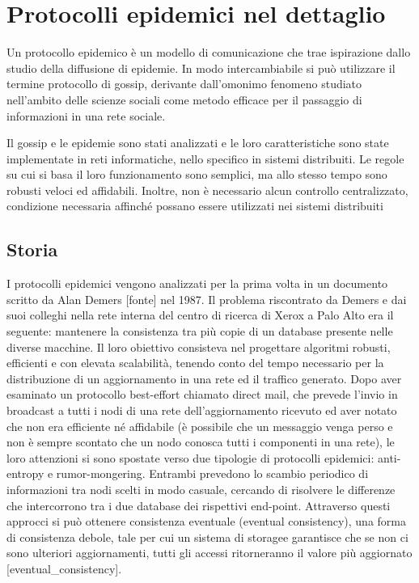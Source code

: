 \chapter{Protocolli epidemici nel dettaglio}
Un protocollo epidemico è un modello di comunicazione che trae ispirazione dallo studio della diffusione di epidemie. In modo intercambiabile si può utilizzare il termine protocollo di gossip, derivante dall'omonimo fenomeno studiato nell'ambito delle scienze sociali come metodo efficace per il passaggio di informazioni in una rete sociale.

Il gossip e le epidemie sono stati analizzati e le loro caratteristiche sono state implementate in reti informatiche, nello specifico in sistemi distribuiti. Le regole su cui si basa il loro funzionamento sono semplici, ma allo stesso tempo sono robusti veloci ed affidabili. Inoltre, non è necessario alcun controllo centralizzato, condizione necessaria affinché possano essere utilizzati nei sistemi distribuiti

\section{Storia}
I protocolli epidemici vengono analizzati per la prima volta in un documento scritto da Alan Demers [fonte] nel 1987. Il problema riscontrato da Demers e dai suoi colleghi nella rete interna del centro di ricerca di Xerox a Palo Alto era il seguente: mantenere la consistenza tra più copie di un database presente nelle diverse macchine. Il loro obiettivo consisteva nel progettare algoritmi robusti, efficienti e con elevata scalabilità, tenendo conto del tempo necessario per la distribuzione di un aggiornamento in una rete ed il traffico generato. Dopo aver esaminato un protocollo best-effort chiamato direct mail, che prevede l'invio in broadcast a tutti i nodi di una rete dell'aggiornamento ricevuto ed aver notato che non era efficiente né affidabile (è possibile che un messaggio venga perso e non è sempre scontato che un nodo conosca tutti i componenti in una rete), le loro attenzioni si sono spostate verso due tipologie di protocolli epidemici: anti-entropy e rumor-mongering. Entrambi prevedono lo scambio periodico di informazioni tra nodi scelti in modo casuale, cercando di risolvere le differenze che intercorrono tra i due database dei rispettivi end-point. Attraverso questi approcci si può ottenere consistenza eventuale (eventual consistency), una forma di consistenza debole, tale per cui un sistema di storagee garantisce che se non ci sono ulteriori aggiornamenti, tutti gli accessi ritorneranno il valore più aggiornato [eventual\_consistency].

